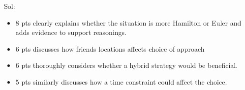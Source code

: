 \documentclass[12pt]{exam}
\begin{document}
\begin{enumerate}
Sol:
\begin{itemize}
    \item 8 pts clearly explains whether the situation is more Hamilton or Euler and adds evidence to support reasonings.
    \item 6 pts discusses how friends locations affects choice of approach
    \item 6 pts thoroughly considers whether a hybrid strategy would be beneficial.
    \item 5 pts similarly discusses how a time constraint could affect the choice.
\end{itemize}

\end{enumerate}
\end{document}

